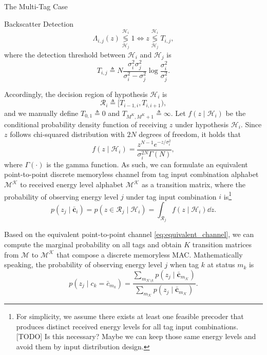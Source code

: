 \documentclass[journal]{IEEEtran}
\begin{document}
\begin{section}{The Multi-Tag Case}
\begin{subsection}{Backscatter Detection}
			\begin{equation}
				\Lambda_{i,j}(z) \underset{\mathcal{H}_j}{\overset{\mathcal{H}_i}{\lessgtr}} 1 \iff z \underset{\mathcal{H}_j}{\overset{\mathcal{H}_i}{\lessgtr}} T_{i,j},
				\label{eq:decision_rule}
			\end{equation}
			where the detection threshold between $\mathcal{H}_i$ and $\mathcal{H}_j$ is
			\begin{equation}
				T_{i,j} \triangleq N \frac{\sigma_i^2 \sigma_j^2}{\sigma_i^2 - \sigma_j^2} \log \frac{\sigma_i^2}{\sigma_j^2}.
				\label{eq:detection_threshold}
			\end{equation}

			Accordingly, the decision region of hypothesis $\mathcal{H}_i$ is
			\begin{equation}
				\mathcal{R}_i \triangleq [T_{i-1, i}, T_{i, i+1}),
				\label{eq:decision_region}
			\end{equation}
			and we manually define $T_{0,1} \triangleq 0$ and $T_{M^K,M^K+1} \triangleq \infty$. Let $f(z \mid \mathcal{H}_i)$ be the conditional probability density function of receiving $z$ under hypothesis $\mathcal{H}_i$. Since $z$ follows chi-squared distribution with $2N$ degrees of freedom, it holds that
			\begin{equation}
				f(z \mid \mathcal{H}_i) = \frac{z^{N-1} e^{-z/\sigma_i^2}}{\sigma_i^{2N} \Gamma(N)},
				\label{eq:energy_distribution}
			\end{equation}
			where $\Gamma(\cdot)$ is the gamma function. As such, we can formulate an equivalent point-to-point discrete memoryless channel from tag input combination alphabet $\mathcal{M^K}$ to received energy level alphabet $\mathcal{M^K}$ as a transition matrix, where the probability of observing energy level $j$ under tag input combination $i$ is\footnote{For simplicity, we assume there exists at least one feasible precoder that produces distinct received energy levels for all tag input combinations. [TODO] Is this necessary? Maybe we can keep those same energy levels and avoid them by input distribution design.}
			\begin{equation}
				p(z_j \mid \bar{\boldsymbol{c}}_i) = p(z \in \mathcal{R}_j \mid \mathcal{H}_i) = \int_{\mathcal{R}_j} f(z \mid \mathcal{H}_i) \dd z.
				\label{eq:equivalent_channel}
			\end{equation}

			Based on the equivalent point-to-point channel \eqref{eq:equivalent_channel}, we can compute the marginal probability on all tags and obtain $K$ transition matrices from $\mathcal{M}$ to $\mathcal{M^K}$ that compose a discrete memoryless MAC. Mathematically speaking, the probability of observing energy level $j$ when tag $k$ at status $m_k$ is
			\begin{equation}
				p(z_j \mid c_k = \bar{c}_{m_k}) = \frac{\sum_{m_{\mathcal{K} \setminus k}} p(z_j \mid \bar{\boldsymbol{c}}_{m_{\mathcal{K}}})}{\sum_{m_{\mathcal{K}}} p(z_j \mid \bar{\boldsymbol{c}}_{m_{\mathcal{K}}})}.
				\label{eq:mac}
			\end{equation}


\end{subsection}
\end{section}
\end{document}
